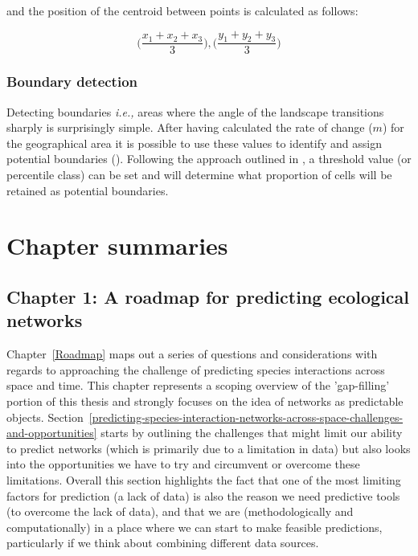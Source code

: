 \begin{refsection}
and the position of the centroid between points is calculated as follows:

$$ \Big( \frac{x_{1} + x_{2} + x_{3}}{3} \Big), \Big( \frac{y_{1} + y_{2} +
y_{3}}{3} \Big) $$

\subsubsection{Boundary detection}

Detecting boundaries \emph{i.e.,} areas where the angle of the landscape
transitions sharply is surprisingly simple. After having calculated the
rate of change (\(m\)) for the geographical area it is possible to use
these values to identify and assign potential boundaries
(\cite{Fortin2005SpaAna, Oden1993CatWom, Fortin1995DelEco}). Following the
approach outlined in \cite{Fortin2005SpaAna}, a threshold value (or
percentile class) can be set and will determine what proportion of cells
will be retained as potential boundaries.

\section{Chapter summaries}

\subsection{Chapter 1: A roadmap for predicting ecological networks}

Chapter~\ref{Roadmap} maps out a series of questions and considerations with regards to approaching the challenge of predicting species interactions across space and time. This chapter represents a scoping overview of the 'gap-filling' portion of this thesis and strongly focuses on the idea of networks as predictable objects. Section~\ref{predicting-species-interaction-networks-across-space-challenges-and-opportunities} starts by outlining the challenges that might limit our ability to predict networks (which is primarily due to a limitation in data) but also looks into the opportunities we have to try and circumvent or overcome these limitations. Overall this section highlights the fact that one of the most limiting factors for prediction (a lack of data) is also the reason we need predictive tools (to overcome the lack of data), and that we are (methodologically and computationally) in a place where we can start to make feasible predictions, particularly if we think about combining different data sources.


\end{refsection}

